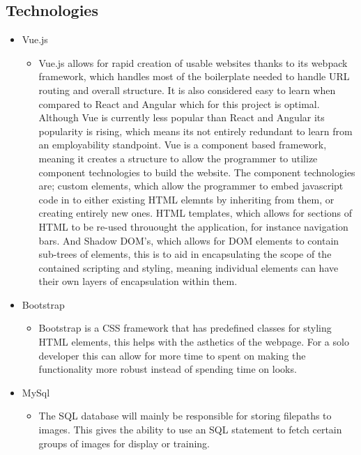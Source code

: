 \subsection{Technologies}
  \begin{itemize}
    \item Vue.js
    \begin{itemize}
      \item Vue.js allows for rapid creation of usable websites thanks to its webpack framework, which handles most of the boilerplate needed to handle URL routing and overall structure. It is also considered easy to learn when compared to React and Angular \cite{StudiengangBachelor} which for this project is optimal. Although Vue is currently less popular than React and Angular its popularity is rising, which means its not entirely redundant to learn from an employability standpoint. Vue is a component based framework, meaning it creates a structure to allow the programmer to utilize component technologies to build the website. The component technologies are; custom elements, which allow the programmer to embed javascript code in to either existing HTML elemnts by inheriting from them, or creating entirely new ones. HTML templates, which allows for sections of HTML to be re-used throuought the application, for instance navigation bars. And Shadow DOM's, which allows for DOM elements to contain sub-trees of elements, this is to aid in encapsulating the scope of the contained scripting and styling, meaning individual elements can have their own layers of encapsulation within them.
    \end{itemize}
    \item Bootstrap
        \begin{itemize}
          \item Bootstrap is a CSS framework that has predefined classes for styling HTML elements, this helps with the asthetics of the webpage. For a solo developer this can allow for more time to spent on making the functionality more robust instead of spending time on looks.
        \end{itemize}
    \item MySql
    \begin{itemize}
      \item The SQL database will mainly be responsible for storing filepaths to images. This gives the ability to use an SQL statement to fetch certain groups of images for display or training.

\end{itemize}
\end{itemize}
